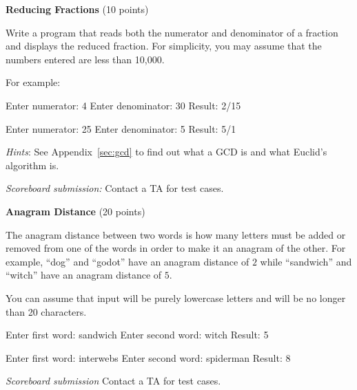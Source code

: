 \documentclass[11pt]{cselabheader}
\theoremstyle{plain}
\begin{document}
\begin{prob}[fractions.py]
    \textbf{Reducing Fractions} (10 points)


    Write a program that reads both the numerator and denominator of
    a fraction and displays the reduced fraction. For simplicity, you
    may assume that the numbers entered are less than 10,000. 

    For example:

    \begin{verbatimcode}
Enter numerator: 4
Enter denominator: 30
Result: 2/15
    \end{verbatimcode}

    \begin{verbatimcode}
Enter numerator: 25
Enter denominator: 5
Result: 5/1
    \end{verbatimcode}

    \textit{Hints}: See Appendix~\ref{sec:gcd} to find out what a GCD is 
    and what Euclid's algorithm is. 

    \textit{Scoreboard submission:} Contact a TA for test cases.
\end{prob}


\begin{prob}[anadist.py]
    \textbf{Anagram Distance} (20 points)

    The anagram distance between two words is how many letters must be added
    or removed from one of the words in order to make it an anagram of the
    other. For example, ``dog'' and ``godot'' have an anagram distance of $2$
    while ``sandwich'' and ``witch'' have an anagram distance of $5$.

    You can assume that input will be purely lowercase letters and will be
    no longer than 20 characters.

    \begin{verbatimcode}
Enter first word: sandwich
Enter second word: witch
Result: 5
    \end{verbatimcode}

    \begin{verbatimcode}
Enter first word: interwebs
Enter second word: spiderman
Result: 8
    \end{verbatimcode}

    \textit{Scoreboard submission} Contact a TA for test cases.
\end{prob}
\end{document}
